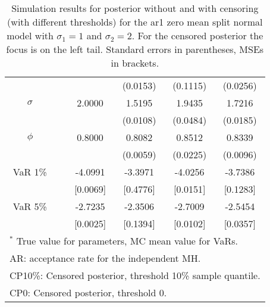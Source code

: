 {\begin{table}
\begin{tabular}{cc cccc}
&&   & (0.0153) & (0.1115) & (0.0256)  \\ 
$\sigma$&& 2.0000 & 1.5195 & 1.9435 & 1.7216  \\ 
&&   & (0.0108) & (0.0484) & (0.0185)  \\ 
$\phi$&& 0.8000 & 0.8082 & 0.8512 & 0.8339  \\ 
&&   & (0.0059) & (0.0225) & (0.0096)  \\ 
VaR 1\% && -4.0991 & -3.3971 & -4.0256 & -3.7386  \\ 
  && [0.0069] & [0.4776] & [0.0151] & [0.1283]  \\ 
VaR 5\% && -2.7235 & -2.3506 & -2.7009 & -2.5454  \\ 
 && [0.0025] & [0.1394] & [0.0102] & [0.0357]  \\ 
\hline 
\multicolumn{6}{l}{\footnotesize{$^*$ True value for parameters, MC mean value for VaRs.}}  \\ 
\multicolumn{6}{l}{\footnotesize{AR: acceptance rate for the independent MH.}}  \\ 
\multicolumn{6}{l}{\footnotesize{CP10\%: Censored posterior, threshold 10\% sample quantile.}}  \\ 
\multicolumn{6}{l}{\footnotesize{CP0: Censored posterior, threshold 0.}} 
\end{tabular}
 \caption{Simulation results for posterior without and with censoring (with different thresholds) for the ar1 zero mean split normal model with $\sigma_{1} = 1$ and $\sigma_{2} = 2$. For the censored posterior the focus is on the left tail. Standard errors in parentheses, MSEs in brackets.} 
\label{tab:ar1_s2}  
\end{table}
}
